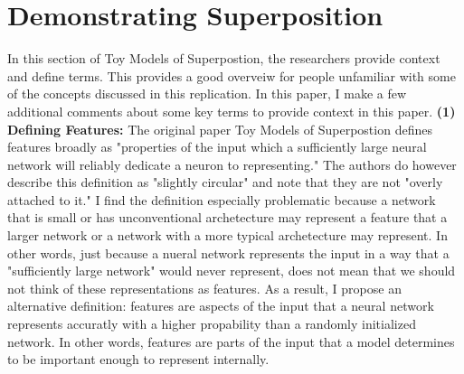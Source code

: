 \documentclass{article} %
\begin{document}
\section{Demonstrating Superposition}

In this section of Toy Models of Superpostion\cite{elhage2022toy}, the researchers
provide context and define terms. This provides a good overveiw for people
unfamiliar with some of the concepts discussed in this replication.\newline\newline
In this paper, I make a few additional comments about some key terms to provide
context in this paper. \newline \newline
\textbf{(1) Defining Features: }The original paper Toy Models of Superpostion
defines features broadly as "properties of the input which a sufficiently large 
neural network will reliably dedicate a neuron to representing." The authors do
however describe this definition as "slightly circular" and note that they are
not "overly attached to it."\newline\newline
I find the definition especially problematic because a network that is small or
has unconventional archetecture may represent a feature that a larger network
or a network with a more typical archetecture may represent. In other words, just
because a nueral network represents the input in a way that a "sufficiently large network"
would never represent, does not mean that we should not think of these representations 
as features.\newline\newline
As a result, I propose an alternative definition: features are aspects of the
input that a neural network represents accuratly with a higher propability than 
a randomly initialized network. In other words, features are parts of the input 
that a model determines to be important enough to represent internally.




\end{document}
